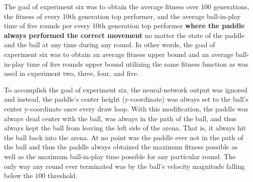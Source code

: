The goal of experiment six was to obtain the average fitness over 100 generations, the fitness of every 10th generation top performer, and the average ball-in-play time of five rounds per every 10th generation top performer \textbf{where the paddle always performed the correct movement} no matter the state of the paddle and the ball at any time during any round. In other words, the goal of experiment six was to obtain an average fitness upper bound and an average ball-in-play time of five rounds upper bound utilizing the same fitness function as was used in experiment two, three, four, and five. 

To accomplish the goal of experiment six, the neural-network output was ignored and instead, the paddle's center height (y-coordinate) was always set to the ball's center y-coordinate once every draw loop. With this modification, the paddle was always dead center with the ball, was always in the path of the ball, and thus always kept the ball from leaving the left side of the arena. That is, it always hit the ball back into the arena. At no point was the paddle ever not in the path of the ball and thus the paddle always obtained the maximum fitness possible as well as the maximum ball-in-play time possible for any particular round. The only way any round ever terminated was by the ball's velocity magnitude falling below the $100$ threshold.  


